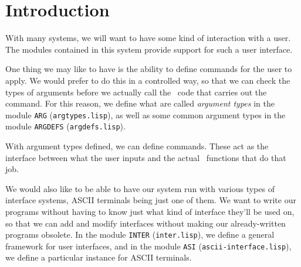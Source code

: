 \section{Introduction}

With many systems, we will want to have some kind of interaction with a
user.  The modules contained in this system provide support for such a
user interface.

One thing we may like to have is the ability to define commands for the
user to apply.  We would prefer to do this in a controlled way, so that
we can check the types of arguments before we actually call the \lisp\ 
code that carries out the command.  For this reason, we define what are
called {\em argument types\/} in the module {\tt ARG} ({\tt argtypes.lisp}),
as well as some common argument types in the module {\tt ARGDEFS}
({\tt argdefs.lisp}). 

With argument types defined, we can define commands. These act as the
interface between what the user inputs and the actual \lisp\ functions
that do that job.

We would also like to be able to have our system run with various types
of interface systems, ASCII terminals being just one of them.  We want
to write our programs without having to know just what kind of interface
they'll be used on, so that we can add and modify interfaces without
making our already-written programs obsolete.  In the module {\tt INTER}
({\tt inter.lisp}), we define a general framework for user interfaces, and
in the module {\tt ASI} ({\tt ascii-interface.lisp}), we define a
particular instance for ASCII terminals.

